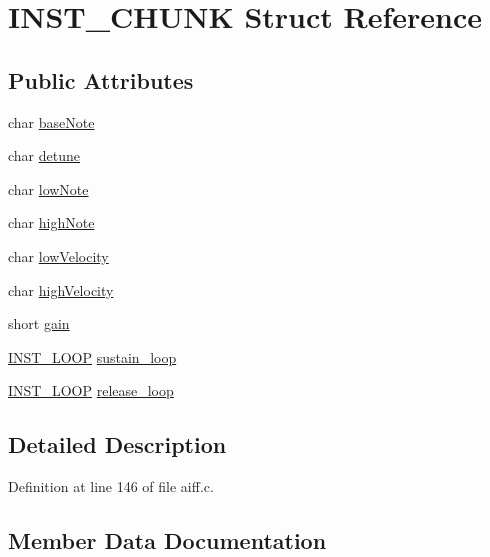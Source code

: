 \hypertarget{struct_i_n_s_t___c_h_u_n_k}{}\section{I\+N\+S\+T\+\_\+\+C\+H\+U\+NK Struct Reference}
\label{struct_i_n_s_t___c_h_u_n_k}
\subsection*{Public Attributes}
\begin{DoxyCompactItemize}
\item 
char \hyperlink{struct_i_n_s_t___c_h_u_n_k_a0068555f5659374b12d7c60d2336b367}{base\+Note}
\item 
char \hyperlink{struct_i_n_s_t___c_h_u_n_k_a8dd7080b2e8d4c805c2298d3f62ec2f4}{detune}
\item 
char \hyperlink{struct_i_n_s_t___c_h_u_n_k_a915f90531c6968c5dd3534aa21052e5b}{low\+Note}
\item 
char \hyperlink{struct_i_n_s_t___c_h_u_n_k_a076924bdcc602027bbcdd35dce87b90a}{high\+Note}
\item 
char \hyperlink{struct_i_n_s_t___c_h_u_n_k_a6ba82c7834b47c66cdeca805fc7df41f}{low\+Velocity}
\item 
char \hyperlink{struct_i_n_s_t___c_h_u_n_k_a4bf9443567926117d6603a02b56785eb}{high\+Velocity}
\item 
short \hyperlink{struct_i_n_s_t___c_h_u_n_k_a60e33b42c98ae62484d1542176dc7cf0}{gain}
\item 
\hyperlink{struct_i_n_s_t___l_o_o_p}{I\+N\+S\+T\+\_\+\+L\+O\+OP} \hyperlink{struct_i_n_s_t___c_h_u_n_k_a40f8a09a1dfe4962e70a3099030b11a9}{sustain\+\_\+loop}
\item 
\hyperlink{struct_i_n_s_t___l_o_o_p}{I\+N\+S\+T\+\_\+\+L\+O\+OP} \hyperlink{struct_i_n_s_t___c_h_u_n_k_a8b04f9d206ac94748f16000795a33b4c}{release\+\_\+loop}
\end{DoxyCompactItemize}


\subsection{Detailed Description}


Definition at line 146 of file aiff.\+c.



\subsection{Member Data Documentation}
